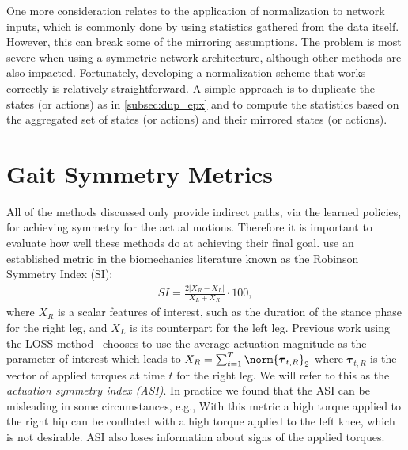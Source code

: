 One more consideration relates to the application of normalization to network inputs, which is commonly done by 
using statistics gathered from the data itself.  
However, this can break some of the mirroring assumptions.  
The problem is most severe when using a symmetric network architecture, although other methods are
also impacted.
Fortunately, developing a normalization scheme that works correctly is relatively straightforward. 
A simple approach is to duplicate the states (or actions) as in \autoref{subsec:dup_epx} 
and to compute the statistics based on the aggregated set of states (or actions) and 
their mirrored states (or actions).



\section{Gait Symmetry Metrics}

All of the methods discussed only provide indirect paths, via the learned policies, 
for achieving symmetry for the actual motions. 
Therefore it is important to evaluate how well these methods do at achieving their final goal. 
\citeauthor{Yu-SIGGRAPH-2018}\cite{Yu-SIGGRAPH-2018} use an established metric in the biomechanics literature 
known as the Robinson Symmetry Index (SI):
\begin{align}
    SI = \frac{2|X_R - X_L|}{X_L + X_R}\cdot 100,
\end{align}
where $X_R$ is a scalar features of interest, such as the duration of the stance phase 
for the right leg, and $X_L$ is its counterpart for the left leg. 
Previous work using the LOSS method~\cite{Yu-SIGGRAPH-2018} chooses to use the average actuation 
magnitude as the parameter of interest which leads to $X_R = \sum_{t=1}^T \norm{\boldsymbol{\tau}_{t,R}}_2$ where $\boldsymbol{\tau}_{t,R}$ is the vector of applied torques at time $t$ for the right leg. 
We will refer to this as the \textit{actuation symmetry index (ASI)}.
In practice we found that the ASI can be misleading in some circumstances, 
e.g., With this metric a high torque applied to the right hip can be conflated with a high torque applied to the left knee, 
which is not desirable. ASI also loses information about signs of the applied torques.

